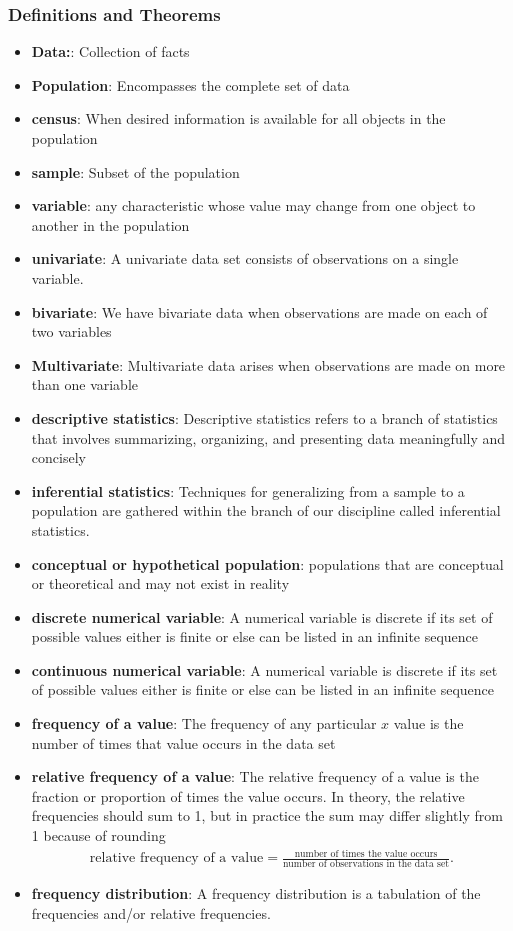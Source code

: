 \documentclass{report}
\begin{document}
    \subsubsection{Definitions and Theorems}
    \begin{itemize}
        \item \textbf{Data:}: Collection of facts
        \item \textbf{Population}: Encompasses the complete set of data
        \item \textbf{census}: When desired information is available for all objects in the population
        \item \textbf{sample}: Subset of the population
        \item \textbf{variable}: any characteristic whose value may change from one object to another in the population
        \item \textbf{univariate}: A univariate data set consists of observations on a single variable.
        \item \textbf{bivariate}: We have bivariate data when observations are made on each of two variables
        \item \textbf{Multivariate}: Multivariate data arises when observations are made on more than one variable
        \item \textbf{descriptive statistics}: Descriptive statistics refers to a branch of statistics that involves summarizing, organizing, and presenting data meaningfully and concisely
        \item \textbf{inferential statistics}: Techniques for generalizing from a sample to a population are gathered within the branch of our discipline called inferential statistics.
        \item \textbf{conceptual or hypothetical population}: populations that are conceptual or theoretical and may not exist in reality
        \item \textbf{discrete numerical variable}: A numerical variable is discrete if its set of possible values either is finite or else can be listed in an infinite sequence
        \item \textbf{continuous numerical variable}: A numerical variable is discrete if its set of possible values either is finite or else can be listed in an infinite sequence
        \item \textbf{frequency of a value}: The frequency of any particular $x$ value is the number of times that value occurs in the data set
        \item \textbf{relative frequency of a value}: The relative frequency of a value is the fraction or proportion of times the value occurs. In theory, the relative frequencies should sum to 1, but in practice the sum may differ slightly from 1 because of rounding
            \begin{align*}
                \text{relative frequency of a value} = \frac{\text{number of times the value occurs}}{\text{number of observations in the data set}}
            .\end{align*}
        \item \textbf{frequency distribution}: A frequency distribution is a tabulation of the frequencies and/or relative frequencies.


\end{itemize}
\end{document}
